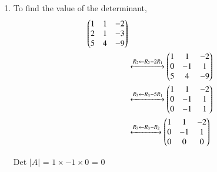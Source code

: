 \renewcommand{\theequation}{\theenumi}
\begin{enumerate}[label=\arabic*.,ref=\thesubsubsection.\theenumi]
%
\item To find the value of the determinant, \\
\begin{align}
\begin{pmatrix}1 & 1 & -2\\
2 & 1 & -3\\
5 & 4 & -9
\end{pmatrix}\\
&\xleftrightarrow[]{R_2 \leftarrow R_2 - 2R_1}
\begin{pmatrix}1 & 1 & -2\\
0 & -1 & 1\\
5 & 4 & -9
\end{pmatrix}\\
&\xleftrightarrow[]{R_3 \leftarrow R_3 - 5R_1}
\begin{pmatrix}1 & 1 & -2\\
0 & -1 & 1\\
0 & -1 & 1
\end{pmatrix}\\
&\xleftrightarrow[]{R_3 \leftarrow R_3 - R_2}
\begin{pmatrix}1 & 1 & -2\\
0 & -1 & 1\\
0 & 0 & 0
\end{pmatrix}
\end{align}

Det $|A|$ = $1 \times -1 \times 0$ = $0$

\end{enumerate}